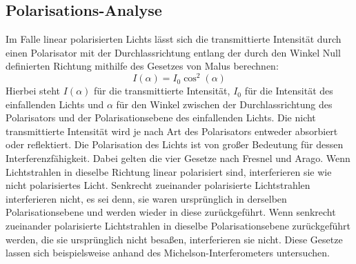 \subsection{Polarisations-Analyse}
Im Falle linear polarisierten Lichts lässt sich die transmittierte Intensität durch einen Polarisator mit der Durchlassrichtung entlang der durch den Winkel Null definierten Richtung mithilfe des Gesetzes von Malus berechnen:
\begin{equation}
    I(\alpha) = I_0 \cos^2(\alpha)
    \label{eq:malus}
\end{equation}
Hierbei steht $I(\alpha)$ für die transmittierte Intensität, $I_0$ für die Intensität des einfallenden Lichts und $\alpha$ für den Winkel zwischen der Durchlassrichtung des Polarisators und der Polarisationsebene des einfallenden Lichts.
Die nicht transmittierte Intensität wird je nach Art des Polarisators entweder absorbiert oder reflektiert.
Die Polarisation des Lichts ist von großer Bedeutung für dessen Interferenzfähigkeit. 
Dabei gelten die vier Gesetze nach Fresnel und Arago. 
Wenn Lichtstrahlen in dieselbe Richtung linear polarisiert sind, interferieren sie wie nicht polarisiertes Licht. 
Senkrecht zueinander polarisierte Lichtstrahlen interferieren nicht, es sei denn, sie waren ursprünglich in derselben Polarisationsebene und werden wieder in diese zurückgeführt. 
Wenn senkrecht zueinander polarisierte Lichtstrahlen in dieselbe Polarisationsebene zurückgeführt werden, die sie ursprünglich nicht besaßen, interferieren sie nicht. 
Diese Gesetze lassen sich beispielsweise anhand des Michelson-Interferometers untersuchen.

